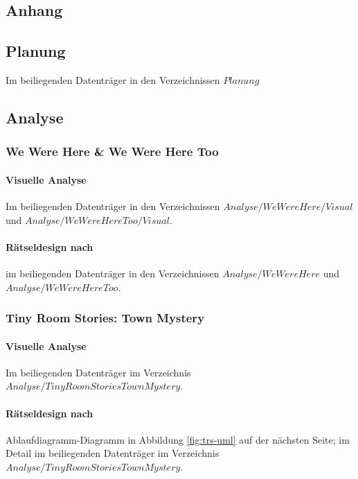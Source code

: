 \documentclass[
	12pt,
	a4paper,
	bibtotoc,
	cleardoubleempty, 
	idxtotoc,
	ngerman,
	openright
	final,
	listof=nochaptergap,
	]{scrbook}
\begin{document}
\begin{appendices}
\chapter{Anhang}

\section{Planung}
Im beiliegenden Datenträger in den Verzeichnissen $Planung$

\section{Analyse}

\subsection{We Were Here \& We Were Here Too}\label{sec:append_anylsis_wwh_wwht}

\subsubsection{Visuelle Analyse}\label{sec:append_anylsis_wwh_wwht_visual}
Im beiliegenden Datenträger in den Verzeichnissen $Analyse/WeWereHere/Visual$ und $Analyse/WeWereHereToo/Visual$.

\subsubsection{Rätseldesign nach \cite{schafer_grim_1996}}\label{sec:append_riddles_wwh_wwht}
im beiliegenden Datenträger in den Verzeichnissen $Analyse/WeWereHere$ und $Analyse/WeWereHereToo$.

\subsection{Tiny Room Stories: Town Mystery}\label{sec:append_anylsis_trstm}

\subsubsection{Visuelle Analyse}\label{sec:append_analysis_trstm}
Im beiliegenden Datenträger im Verzeichnis $Analyse/TinyRoomStoriesTownMystery$.

\subsubsection{Rätseldesign nach \cite{schafer_grim_1996}}\label{sec:append_riddles_trstm}
Ablaufdiagramm-Diagramm in Abbildung \ref{fig:trs-uml} auf der nächsten Seite; im Detail im beiliegenden Datenträger im Verzeichnis $Analyse/TinyRoomStoriesTownMystery$.


\end{appendices}
\end{document}

